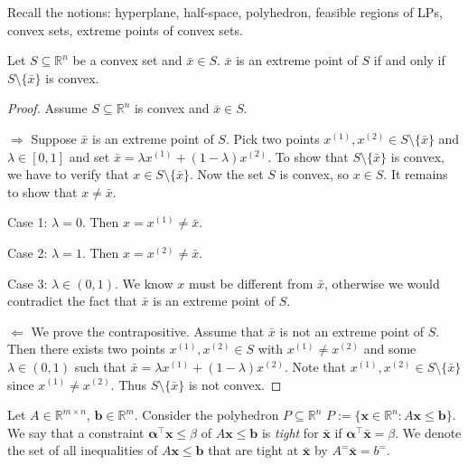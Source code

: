 Recall the notions: hyperplane, half-space, polyhedron,
feasible regions of LPs, convex sets, extreme points
of convex sets.

\begin{thmbox}
    \begin{theorem}
        Let $ S\subseteq \mathbb{R}^n $ be a convex set and $ \bar{x}\in S $. 
        $ \bar{x} $ is an extreme point of $ S $ if and only if
        $ S\setminus \{\bar{x}\} $ is convex.
    \end{theorem}
\end{thmbox}
\begin{proof}
    Assume $ S\subseteq\mathbb{R}^n $ is convex and $ \bar{x}\in S $.

    $\Rightarrow$
    Suppose $ \bar{x} $ is an extreme point of $ S $. Pick two points
    $ x^{(1)},x^{(2)}\in S\setminus\{\bar{x}\} $ and $ \lambda\in[0,1] $
    and set $\bar{x}=\lambda x^{(1)} + (1-\lambda)x^{(2)}$. To show
    that $ S\setminus\{\bar{x}\} $ is convex, we have to verify that $ x\in S\setminus\{\bar{x}\} $.
    Now the set $ S $ is convex, so $ x\in S $. It remains to show that
    $ x\neq \bar{x} $.

    Case 1: $ \lambda =0 $. Then $ x=x^{(1)}\neq \bar{x} $.

    Case 2: $ \lambda =1 $. Then $ x=x^{(2)}\neq \bar{x} $.

    Case 3: $ \lambda\in(0,1) $. We know $ x $ must be different from
    $ \bar{x} $, otherwise we would contradict the fact that $ \bar{x} $ is
    an extreme point of $ S $.

    $ \Leftarrow $ We prove the contrapositive. Assume that $ \bar{x} $
    is not an extreme point of $ S $. Then there exists two points
    $ x^{(1)},x^{(2)}\in S $ with $ x^{(1)}\neq x^{(2)} $ and some
    $ \lambda\in(0,1) $ such that $\bar{x}=\lambda x^{(1)} + (1-\lambda)x^{(2)}$.
    Note that $ x^{(1)},x^{(2)}\in S\setminus\{\bar{x}\}$ since
    $ x^{(1)}\neq x^{(2)} $. Thus $ S\setminus\{\bar{x}\} $ is not convex.
\end{proof}

\begin{defbox}
    \begin{definition}
        Let $ A\in \mathbb{R}^{m \times n} $, $ \bm{b}\in \mathbb{R}^m $. Consider
        the polyhedron $ P\subseteq \mathbb{R}^n $
        $ P:=\{\bm{x}\in\mathbb{R}^n:A\bm{x}\leqslant \bm{b}\} $. We say
        that a constraint $ \bm{\alpha ^\top} \bm{x}\leqslant \beta $ of
        $ A \bm{x}\leqslant \bm{b} $ is \emph{tight} for $ \bm{\bar{x}} $ if
        $ \bm{\alpha}^\top \bm{\bar{x}}=\beta $. We denote the set of all
        inequalities of $ A \bm{x}\leqslant \bm{b} $ that
        are tight at $ \bm{\bar{x}} $ by $ A^=\bm{\bar{x}}=b^= $.
    \end{definition}
\end{defbox}


